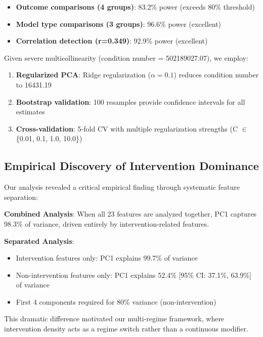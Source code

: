 \documentclass[11pt,letterpaper]{article}
\newcommand{\powerOutcomeGroups}{83.2\%}
\newcommand{\powerModelTypes}{96.6\%}
\newcommand{\powerCorrelation}{92.9\%}
\newcommand{\conditionNumber}{502189027.07}  %
\newcommand{\regularizedConditionNumber}{16431.19}
\newcommand{\regularizationAlpha}{0.1}
\newcommand{\allFeaturesPCOne}{98.3\%}  %
\newcommand{\interventionPCOneVariance}{99.7\%}
\newcommand{\nonInterventionPCOneVariance}{52.4\%}  %
\newcommand{\nonInterventionPCOneCILower}{37.1\%}
\newcommand{\nonInterventionPCOneCIUpper}{63.9\%}
\newcommand{\bootstrapSamples}{100}
\begin{document}
\begin{itemize}
    \item \textbf{Outcome comparisons (4 groups)}: \powerOutcomeGroups{} power (exceeds 80\% threshold)
    \item \textbf{Model type comparisons (3 groups)}: \powerModelTypes{} power (excellent)
    \item \textbf{Correlation detection (r=0.349)}: \powerCorrelation{} power (excellent)
\end{itemize}

Given severe multicollinearity (condition number = \conditionNumber{}), we employ:

\begin{enumerate}
    \item \textbf{Regularized PCA}: Ridge regularization ($\alpha = \regularizationAlpha{}$) reduces condition number to \regularizedConditionNumber{}
    \item \textbf{Bootstrap validation}: \bootstrapSamples{} resamples provide confidence intervals for all estimates
    \item \textbf{Cross-validation}: 5-fold CV with multiple regularization strengths (C $\in$ \{0.01, 0.1, 1.0, 10.0\})
\end{enumerate}

\subsection{Empirical Discovery of Intervention Dominance}

Our analysis revealed a critical empirical finding through systematic feature separation:

\textbf{Combined Analysis}: When all 23 features are analyzed together, PC1 captures \allFeaturesPCOne{} of variance, driven entirely by intervention-related features.

\textbf{Separated Analysis}:
\begin{itemize}
    \item Intervention features only: PC1 explains \interventionPCOneVariance{} of variance
    \item Non-intervention features only: PC1 explains \nonInterventionPCOneVariance{} [95\% CI: \nonInterventionPCOneCILower{}, \nonInterventionPCOneCIUpper{}] of variance
    \item First 4 components required for 80\% variance (non-intervention)
\end{itemize}

This dramatic difference motivated our multi-regime framework, where intervention density acts as a regime switch rather than a continuous modifier.
\end{document}
